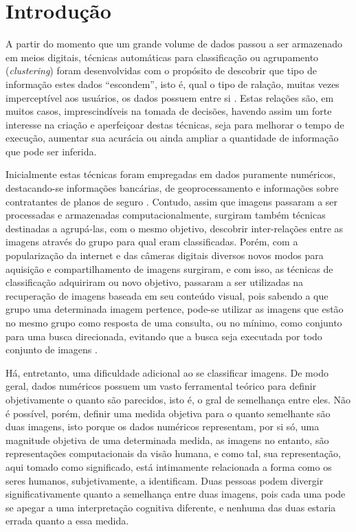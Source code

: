 \chapter{Introdução}

A partir do momento que um grande volume de dados passou a ser armazenado em
meios digitais, técnicas automáticas para classificação ou agrupamento
(\textit{clustering}) foram desenvolvidas com o propósito de descobrir que tipo
de informação estes dados “escondem”, isto é, qual o tipo de ralação, muitas
vezes imperceptível aos usuários, os dados possuem entre si
\cite{WebScaleImageClustering}. Estas relações são,
em muitos casos, imprescindíveis na tomada de decisões, havendo assim um forte
interesse na criação e aperfeiçoar destas técnicas, seja para melhorar o tempo
de execução,  aumentar sua acurácia ou ainda ampliar a quantidade de informação
que pode ser inferida.

Inicialmente estas técnicas foram empregadas em dados puramente numéricos,
destacando-se informações bancárias, de geoprocessamento e informações sobre
contratantes de planos de seguro \cite{History}. Contudo, assim que imagens passaram a ser
processadas e armazenadas computacionalmente, surgiram também técnicas
destinadas a agrupá-las, com o mesmo objetivo, descobrir inter-relações entre
as imagens através do grupo para qual eram classificadas. Porém, com a
popularização da internet e das câmeras digitais diversos novos modos para
aquisição e compartilhamento de imagens surgiram, e com isso, as técnicas de
classificação adquiriram ou novo objetivo, passaram a ser utilizadas na
recuperação de imagens baseada em seu conteúdo visual, pois sabendo a que grupo
uma determinada imagem pertence, pode-se utilizar as imagens que estão no mesmo
grupo como resposta de uma consulta, ou no mínimo, como conjunto para uma busca
direcionada, evitando que a busca seja executada por todo conjunto de imagens
\cite{ImageClusteringBased}.

Há, entretanto, uma dificuldade adicional ao se classificar imagens. De modo
geral, dados numéricos possuem um vasto ferramental teórico para definir
objetivamente o quanto são parecidos, isto é, o gral de semelhança entre eles.
Não é possível, porém, definir uma medida objetiva para o quanto semelhante são
duas imagens, isto porque os dados numéricos representam, por si só, uma
magnitude objetiva de uma determinada medida, as imagens no entanto, são
representações computacionais da visão humana, e como tal, sua representação,
aqui tomado como significado, está intimamente relacionada a forma como os
seres humanos, subjetivamente, a identificam. Duas pessoas podem divergir
significativamente quanto a semelhança entre duas imagens, pois cada uma pode
se apegar a uma interpretação cognitiva diferente, e nenhuma das duas estaria
errada quanto a essa medida.

